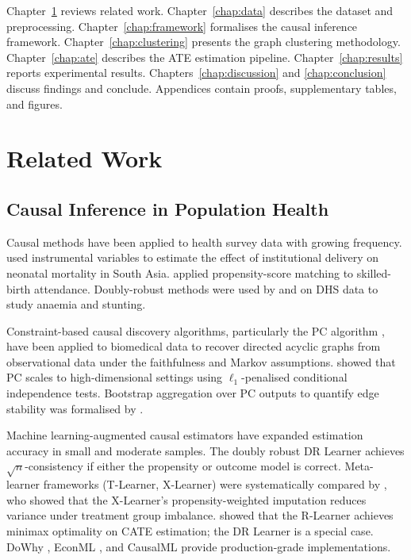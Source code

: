 \documentclass[12pt,a4paper]{report}
\begin{document}
Chapter~\ref{chap:related} reviews related work.
Chapter~\ref{chap:data} describes the dataset and preprocessing.
Chapter~\ref{chap:framework} formalises the causal inference framework.
Chapter~\ref{chap:clustering} presents the graph clustering methodology.
Chapter~\ref{chap:ate} describes the ATE estimation pipeline.
Chapter~\ref{chap:results} reports experimental results.
Chapters~\ref{chap:discussion} and \ref{chap:conclusion} discuss findings and
conclude. Appendices contain proofs, supplementary tables, and figures.

\chapter{Related Work}
\label{chap:related}

\section{Causal Inference in Population Health}

Causal methods have been applied to health survey data with growing frequency.
\citet{Lim2010} used instrumental variables to estimate the effect of institutional
delivery on neonatal mortality in South Asia.
\citet{Bhutta2008} applied propensity-score matching to skilled-birth attendance.
Doubly-robust methods were used by \citet{Luque2019} and \citet{Kennedy2020} on DHS
data to study anaemia and stunting.

Constraint-based causal discovery algorithms, particularly the PC algorithm
\citep{spirtes2000causation}, have been applied to biomedical data to recover
directed acyclic graphs from observational data under the faithfulness and Markov
assumptions.
\citet{kalisch2007estimating} showed that PC scales to high-dimensional settings
using $\ell_1$-penalised conditional independence tests.
Bootstrap aggregation over PC outputs to quantify edge stability was formalised by
\citet{friedman1999learning}.

Machine learning-augmented causal estimators have expanded estimation accuracy in
small and moderate samples.
The doubly robust DR Learner \citep{chernozhukov2018doubleml} achieves
$\sqrt{n}$-consistency if either the propensity or outcome model is correct.
Meta-learner frameworks (T-Learner, X-Learner) were systematically compared by
\citet{kunzel2019metalearners}, who showed that the X-Learner's
propensity-weighted imputation reduces variance under treatment group imbalance.
\citet{nie2021quasioracle} showed that the R-Learner achieves minimax optimality
on CATE estimation; the DR Learner is a special case.
DoWhy \citep{sharma2020dowhy}, EconML \citep{econml}, and CausalML
\citep{chen2020causalml} provide production-grade implementations.
\end{document}
